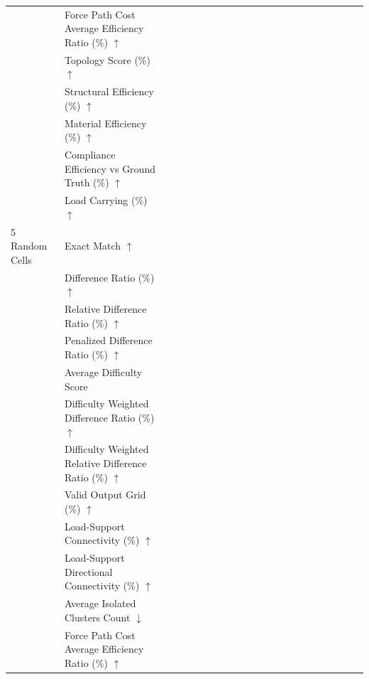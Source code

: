 \begin{table}[!h]
{\begin{tabular}{llllllllllll|llllllllll}
 & Force Path Cost Average Efficiency Ratio (\%) $\uparrow$ &  &  &  &  &  &  &  &  &  &  &  &  &  &  &  &  &  &  &  &  \\
 & Topology Score (\%) $\uparrow$ &  &  &  &  &  &  &  &  &  &  &  &  &  &  &  &  &  &  &  &  \\
 & Structural Efficiency (\%) $\uparrow$ &  &  &  &  &  &  &  &  &  &  &  &  &  &  &  &  &  &  &  &  \\
 & Material Efficiency (\%) $\uparrow$ &  &  &  &  &  &  &  &  &  &  &  &  &  &  &  &  &  &  &  &  \\
 & Compliance Efficiency vs Ground Truth (\%) $\uparrow$ &  &  &  &  &  &  &  &  &  &  &  &  &  &  &  &  &  &  &  &  \\
 & Load Carrying (\%) $\uparrow$ &  &  &  &  &  &  &  &  &  &  &  &  &  &  &  &  &  &  &  &  \\
\midrule
5 Random Cells & Exact Match $\uparrow$ &  &  &  &  &  &  &  &  &  &  &  &  &  &  &  &  &  &  &  &  \\
 & Difference Ratio (\%) $\uparrow$ &  &  &  &  &  &  &  &  &  &  &  &  &  &  &  &  &  &  &  &  \\
 & Relative Difference Ratio (\%) $\uparrow$ &  &  &  &  &  &  &  &  &  &  &  &  &  &  &  &  &  &  &  &  \\
 & Penalized Difference Ratio (\%) $\uparrow$ &  &  &  &  &  &  &  &  &  &  &  &  &  &  &  &  &  &  &  &  \\
 & Average Difficulty Score &  &  &  &  &  &  &  &  &  &  &  &  &  &  &  &  &  &  &  &  \\
 & Difficulty Weighted Difference Ratio (\%) $\uparrow$ &  &  &  &  &  &  &  &  &  &  &  &  &  &  &  &  &  &  &  &  \\
 & Difficulty Weighted Relative Difference Ratio (\%) $\uparrow$ &  &  &  &  &  &  &  &  &  &  &  &  &  &  &  &  &  &  &  &  \\
 & Valid Output Grid (\%) $\uparrow$ &  &  &  &  &  &  &  &  &  &  &  &  &  &  &  &  &  &  &  &  \\
 & Load-Support Connectivity (\%) $\uparrow$ &  &  &  &  &  &  &  &  &  &  &  &  &  &  &  &  &  &  &  &  \\
 & Load-Support Directional Connectivity (\%) $\uparrow$ &  &  &  &  &  &  &  &  &  &  &  &  &  &  &  &  &  &  &  &  \\
 & Average Isolated Clusters Count $\downarrow$ &  &  &  &  &  &  &  &  &  &  &  &  &  &  &  &  &  &  &  &  \\
 & Force Path Cost Average Efficiency Ratio (\%) $\uparrow$ &  &  &  &  &  &  &  &  &  &  &  &  &  &  &  &  &  &  &  &  \\

\end{tabular}}
\end{table}
